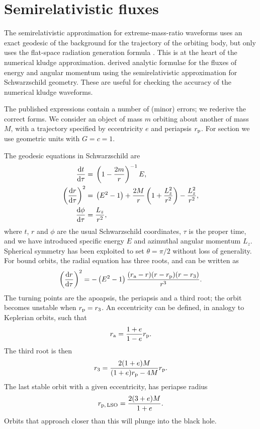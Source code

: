 \chapter{Semirelativistic fluxes}

The semirelativistic approximation for extreme-mass-ratio waveforms uses an exact geodesic of the background for the trajectory of the orbiting body, but only uses the flat-space radiation generation formula \citep{Ruffini1981}. This is at the heart of the numerical kludge approximation. \citet*{Gair2005} derived analytic formulae for the fluxes of energy and angular momentum using the semirelativistic approximation for Schwarzschild geometry. These are useful for checking the accuracy of the numerical kludge waveforms.

The published expressions contain a number of (minor) errors; we rederive the correct forms. We consider an object of mass $m$ orbiting about another of mass $M$, with a trajectory specified by eccentricity $e$ and periapsis $r_\mathrm{p}$. For section we use geometric units with $G = c = 1$.

The geodesic equations in Schwarzschild are
\begin{subequations}
\begin{align}
\frac{\mathrm{d} {t}}{\mathrm{d} {\tau}} = {} & \left(1-\frac{2m}{r}\right)^{-1}E, \\
\left(\frac{\mathrm{d} {r}}{\mathrm{d} {\tau}}\right)^2 = {} & \left(E^2 - 1\right) + \frac{2M}{r}\left(1 + \frac{L_z^2}{r^2}\right) - \frac{L_z^2}{r^2}, \\
\frac{\mathrm{d} {\phi}}{\mathrm{d} {\tau}} = {} & \frac{L_z}{r^2},
\end{align}
\end{subequations}
where $t$, $r$ and $\phi$ are the usual Schwarzschild coordinates, $\tau$ is the proper time, and we have introduced specific energy $E$ and azimuthal angular momentum $L_z$. Spherical symmetry has been exploited to set $\theta = \pi/2$ without loss of generality. For bound orbits, the radial equation has three roots, and can be written as
\begin{equation}
\left(\frac{\mathrm{d} {r}}{\mathrm{d} {\tau}}\right)^2 = -\left(E^2 - 1\right)\frac{(r_\mathrm{a} - r)(r - r_\mathrm{p})(r - r_3)}{r^3}.
\end{equation}
The turning points are the apoapsis, the periapsis and a third root; the orbit becomes unstable when $r_\mathrm{p} = r_3$. An eccentricity can be defined, in analogy to Keplerian orbits, such that
\begin{equation}
r_\mathrm{a} = \frac{1 + e}{1 - e}r_\mathrm{p}.
\end{equation}
The third root is then
\begin{equation}
r_3 = \frac{2(1 + e)M}{(1+e)r_\mathrm{p} - 4M}r_\mathrm{p}.
\end{equation}
The last stable orbit with a given eccentricity, has periapse radius
\begin{equation}
r_\mathrm{p,\,LSO} = \frac{2(3 + e)M}{1+e}.
\end{equation}
Orbits that approach closer than this will plunge into the black hole.

